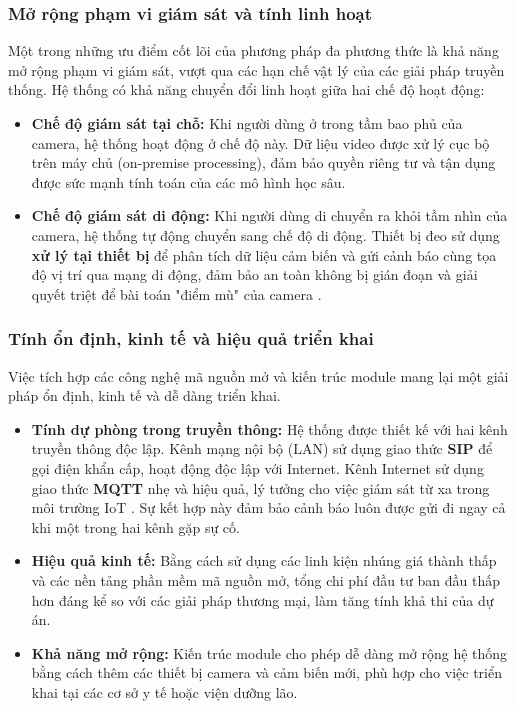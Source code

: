 \subsubsection{Mở rộng phạm vi giám sát và tính linh hoạt}
Một trong những ưu điểm cốt lõi của phương pháp đa phương thức là khả năng mở rộng phạm vi giám sát, vượt qua các hạn chế vật lý của các giải pháp truyền thống. Hệ thống có khả năng chuyển đổi linh hoạt giữa hai chế độ hoạt động:

\begin{itemize}
    \item \textbf{Chế độ giám sát tại chỗ:} Khi người dùng ở trong tầm bao phủ của camera, hệ thống hoạt động ở chế độ này. Dữ liệu video được xử lý cục bộ trên máy chủ (on-premise processing), đảm bảo quyền riêng tư và tận dụng được sức mạnh tính toán của các mô hình học sâu.
    \item \textbf{Chế độ giám sát di động:} Khi người dùng di chuyển ra khỏi tầm nhìn của camera, hệ thống tự động chuyển sang chế độ di động. Thiết bị đeo sử dụng \textbf{xử lý tại thiết bị} để phân tích dữ liệu cảm biến và gửi cảnh báo cùng tọa độ vị trí qua mạng di động, đảm bảo an toàn không bị gián đoạn và giải quyết triệt để bài toán "điểm mù" của camera \cite{researchgate_edge_computing}.
\end{itemize}

\subsubsection{Tính ổn định, kinh tế và hiệu quả triển khai}
Việc tích hợp các công nghệ mã nguồn mở và kiến trúc module mang lại một giải pháp ổn định, kinh tế và dễ dàng triển khai.

\begin{itemize}
    \item \textbf{Tính dự phòng trong truyền thông:} Hệ thống được thiết kế với hai kênh truyền thông độc lập. Kênh mạng nội bộ (LAN) sử dụng giao thức \textbf{SIP} để gọi điện khẩn cấp, hoạt động độc lập với Internet. Kênh Internet sử dụng giao thức \textbf{MQTT} nhẹ và hiệu quả, lý tưởng cho việc giám sát từ xa trong môi trường IoT \cite{parangat_mqtt}. Sự kết hợp này đảm bảo cảnh báo luôn được gửi đi ngay cả khi một trong hai kênh gặp sự cố.
    \item \textbf{Hiệu quả kinh tế:} Bằng cách sử dụng các linh kiện nhúng giá thành thấp và các nền tảng phần mềm mã nguồn mở, tổng chi phí đầu tư ban đầu thấp hơn đáng kể so với các giải pháp thương mại, làm tăng tính khả thi của dự án.
    \item \textbf{Khả năng mở rộng:} Kiến trúc module cho phép dễ dàng mở rộng hệ thống bằng cách thêm các thiết bị camera và cảm biến mới, phù hợp cho việc triển khai tại các cơ sở y tế hoặc viện dưỡng lão.
\end{itemize}

